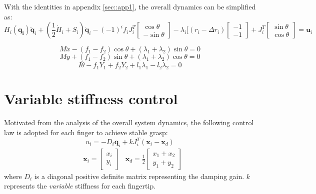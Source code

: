 \documentclass[]{article}
\begin{document}
With the identities in appendix \ref{sec::app1}, the overall dynamics can be simplified as:
\begin{equation}
H_i(\mathbf{q_i})\ddot{\mathbf{q}}_i+(\frac{1}{2}\dot{H}_i+S_i)\mathbf{\dot{q}}_i-(-1)^if_iJ_i^T\begin{bmatrix}
\cos\theta\\
-\sin\theta
\end{bmatrix}-\lambda_i[(r_i-\Delta r_i)\begin{bmatrix}
-1\\-1
\end{bmatrix} + J_i^T\begin{bmatrix}
\sin\theta\\\cos\theta
\end{bmatrix}=\mathbf{u}_i
\end{equation}

\begin{equation}
M\ddot{x}-(f_1-f_2)\cos\theta+(\lambda_1+\lambda_2)\sin\theta=0
\end{equation}
\begin{equation}
M\ddot{y}+(f_1-f_2)\sin\theta+(\lambda_1+\lambda_2)\cos\theta = 0
\end{equation}
\begin{equation}
I\ddot{\theta}-f_1Y_1+f_2Y_2+l_1\lambda_1-l_2\lambda_2=0
\end{equation}
\section{Variable stiffness control}
Motivated from the analysis of the overall system dynamics, the following control law is adopted for each finger to achieve stable grasp:
\begin{equation}
u_i=-D_i\mathbf{q}_i+kJ_i^T(\mathbf{x}_i-\mathbf{x}_d)
\end{equation}
\begin{align}
&\mathbf{x}_i=\begin{bmatrix}
x_i\\
y_i
\end{bmatrix}
&\mathbf{x}_d=\frac{1}{2}\begin{bmatrix}
x_1+x_2\\
y_1+y_2
\end{bmatrix}
\end{align}
where $D_i$ is a diagonal positive definite matrix representing the damping gain. $k$ represents the \emph{variable} stiffness for each fingertip.
\end{document}
